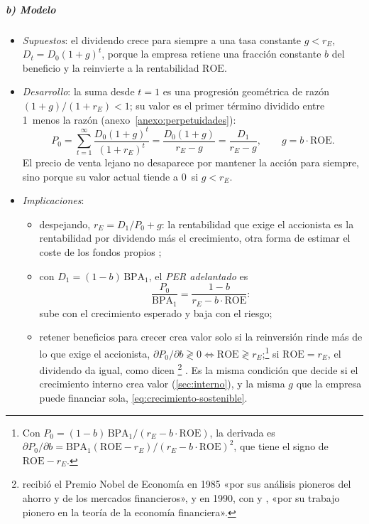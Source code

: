 \documentclass[11pt]{article}
\begin{document}
\subparagraph{b) Modelo}

\begin{itemize}
\item \emph{Supuestos}\nocite{GordonShapiro1956Capital}: el dividendo crece para siempre a una tasa constante $g<r_E$, $D_t=D_0(1+g)^t$, porque la empresa retiene una fracción constante $b$ del beneficio y la reinvierte a la rentabilidad $\mathrm{ROE}$.
\item \emph{Desarrollo}: la suma desde $t=1$ es una progresión geométrica de razón $(1+g)/(1+r_E)<1$; su valor es el primer término dividido entre 1~menos la razón (anexo~\ref{anexo:perpetuidades}):
  \begin{equation}\label{eq:gordon}
  P_0=\sum_{t=1}^{\infty}\frac{D_0(1+g)^t}{(1+r_E)^t}=\frac{D_0(1+g)}{r_E-g}=\frac{D_1}{r_E-g},\qquad g=b\cdot\mathrm{ROE}.
  \end{equation}
  El precio de venta lejano no desaparece por mantener la acción para siempre, sino porque su valor actual tiende a 0~si $g<r_E$.
\item \emph{Implicaciones}:
  \begin{itemize}
  \item despejando, $r_E=D_1/P_0+g$: la rentabilidad que exige el accionista es la rentabilidad por dividendo más el crecimiento, otra forma de estimar el coste de los fondos propios ;
  \item con $D_1=(1-b)\,\mathrm{BPA}_1$, el \emph{PER adelantado} es
    \[
    \frac{P_0}{\mathrm{BPA}_1}=\frac{1-b}{r_E-b\cdot\mathrm{ROE}}:
    \]
    sube con el crecimiento esperado y baja con el riesgo;
  \item retener beneficios para crecer crea valor solo si la reinversión rinde más de lo que exige el accionista, $\partial P_0/\partial b\gtrless0\iff\mathrm{ROE}\gtrless r_E$;\footnote{Con $P_0=(1-b)\,\mathrm{BPA}_1/(r_E-b\cdot\mathrm{ROE})$, la derivada es $\partial P_0/\partial b=\mathrm{BPA}_1(\mathrm{ROE}-r_E)/(r_E-b\cdot\mathrm{ROE})^2$, que tiene el signo de $\mathrm{ROE}-r_E$.} si $\mathrm{ROE}=r_E$, el dividendo da igual, como dicen \textcite{MillerModigliani1961Dividend}\footnote{ recibió el Premio Nobel de Economía en 1985 «por sus análisis pioneros del ahorro y de los mercados financieros»\nocite{Nobel1985Modigliani}, y  en 1990, con  y , «por su trabajo pionero en la teoría de la economía financiera»\nocite{Nobel1990Markowitz}.} . Es la misma condición que decide si el crecimiento interno crea valor (\ref{sec:interno}), y la misma $g$ que la empresa puede financiar sola, \eqref{eq:crecimiento-sostenible}.

\end{itemize}
\end{itemize}
\end{document}
